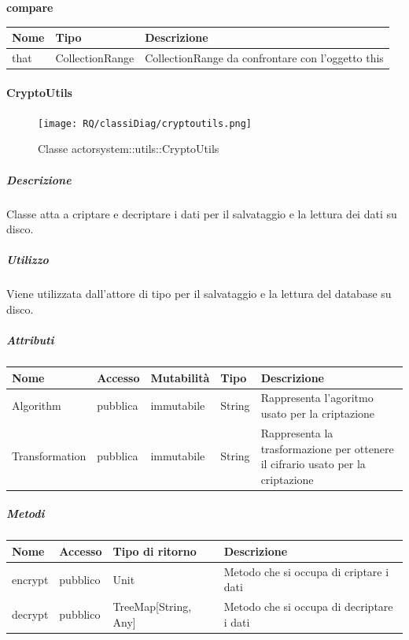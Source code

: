 \documentclass{scalatekids-article}
\begin{document}
\begin{center}
  \textbf{compare}\\
\end{center}
\begin{tabular}{| l | l | l |}
  \hline
  Nome & Tipo & Descrizione\\
  \hline
  that & CollectionRange & CollectionRange da confrontare con l'oggetto this \\
  \hline
\end{tabular}


\paragraph{CryptoUtils}
\label{sec:actorbase::actorsystem::utils::CryptoUtils}

\begin{figure}[H]
  \begin{center}
    \texttt{[image: RQ/classiDiag/cryptoutils.png]}
    \caption{Classe actorsystem::utils::CryptoUtils}
  \end{center}
\end{figure}

\subparagraph{Descrizione}
Classe atta a criptare e decriptare i dati per il salvataggio e la lettura dei dati su disco.

\subparagraph{Utilizzo}
Viene utilizzata dall'attore di tipo  per il salvataggio e la lettura del database su disco.

\subparagraph{Attributi}
\begin{tabular}{| p{3cm} | p{1.5cm} | p{2cm} | p{2cm} | p{8.5cm} |}
  \hline
  Nome & Accesso & Mutabilità & Tipo & Descrizione\\
  \hline
  Algorithm & pubblica & immutabile & String & Rappresenta l'agoritmo usato per la criptazione \\
  \hline
  Transformation & pubblica & immutabile & String & Rappresenta la trasformazione per ottenere il cifrario usato per la criptazione \\
  \hline
\end{tabular}

\subparagraph{Metodi}
\begin{tabular}{| p{3cm} | p{1.5cm} | p{3.5cm} | p{9cm} |}
  \hline
  Nome & Accesso & Tipo di ritorno & Descrizione\\
  \hline
  encrypt & pubblico & Unit & Metodo che si occupa di criptare i dati \\
  \hline
  decrypt & pubblico & TreeMap[String, Any] & Metodo che si occupa di decriptare i dati \\
  \hline
\end{tabular}
\end{document}
